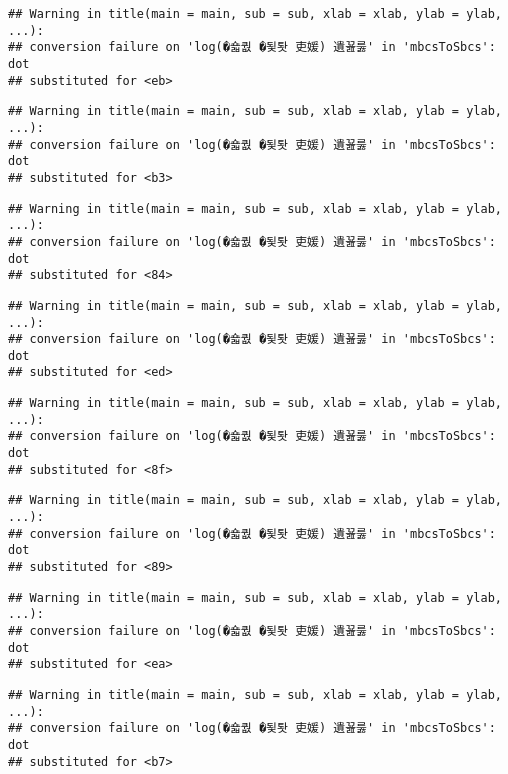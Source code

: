 \documentclass[]{article}
\begin{document}
\begin{verbatim}
## Warning in title(main = main, sub = sub, xlab = xlab, ylab = ylab, ...):
## conversion failure on 'log(�숇퀎 �됯퇏 吏媛) 遺꾪룷' in 'mbcsToSbcs': dot
## substituted for <eb>
\end{verbatim}

\begin{verbatim}
## Warning in title(main = main, sub = sub, xlab = xlab, ylab = ylab, ...):
## conversion failure on 'log(�숇퀎 �됯퇏 吏媛) 遺꾪룷' in 'mbcsToSbcs': dot
## substituted for <b3>
\end{verbatim}

\begin{verbatim}
## Warning in title(main = main, sub = sub, xlab = xlab, ylab = ylab, ...):
## conversion failure on 'log(�숇퀎 �됯퇏 吏媛) 遺꾪룷' in 'mbcsToSbcs': dot
## substituted for <84>
\end{verbatim}

\begin{verbatim}
## Warning in title(main = main, sub = sub, xlab = xlab, ylab = ylab, ...):
## conversion failure on 'log(�숇퀎 �됯퇏 吏媛) 遺꾪룷' in 'mbcsToSbcs': dot
## substituted for <ed>
\end{verbatim}

\begin{verbatim}
## Warning in title(main = main, sub = sub, xlab = xlab, ylab = ylab, ...):
## conversion failure on 'log(�숇퀎 �됯퇏 吏媛) 遺꾪룷' in 'mbcsToSbcs': dot
## substituted for <8f>
\end{verbatim}

\begin{verbatim}
## Warning in title(main = main, sub = sub, xlab = xlab, ylab = ylab, ...):
## conversion failure on 'log(�숇퀎 �됯퇏 吏媛) 遺꾪룷' in 'mbcsToSbcs': dot
## substituted for <89>
\end{verbatim}

\begin{verbatim}
## Warning in title(main = main, sub = sub, xlab = xlab, ylab = ylab, ...):
## conversion failure on 'log(�숇퀎 �됯퇏 吏媛) 遺꾪룷' in 'mbcsToSbcs': dot
## substituted for <ea>
\end{verbatim}

\begin{verbatim}
## Warning in title(main = main, sub = sub, xlab = xlab, ylab = ylab, ...):
## conversion failure on 'log(�숇퀎 �됯퇏 吏媛) 遺꾪룷' in 'mbcsToSbcs': dot
## substituted for <b7>
\end{verbatim}
\end{document}
